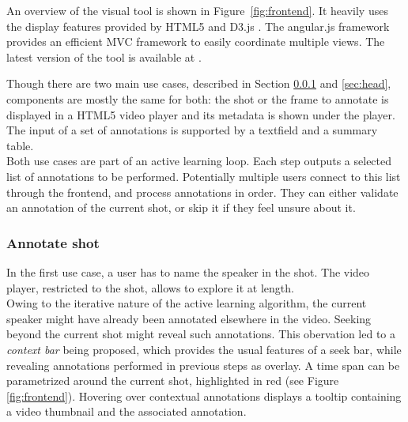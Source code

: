 \documentclass[a4paper]{article}
\begin{document}

An overview of the visual tool is shown in Figure~\ref{fig:frontend}. It heavily uses the display features provided by HTML5 and D3.js \cite{d3js}. The angular.js framework \cite{angularjs} provides an efficient MVC framework to easily coordinate multiple views. The latest version of the tool is available at \cite{urlfrontend}.



Though there are two main use cases, described in Section \ref{sec:shot} and \ref{sec:head}, components are mostly the same for both: the shot or the frame to annotate is displayed in a HTML5 video player and its metadata is shown under the player. The input of a set of annotations is supported by a textfield and a summary table.\\

Both use cases are part of an active learning loop. Each step outputs a selected list of annotations to be performed. Potentially multiple users connect to this list through the frontend, and process annotations in order. They can either validate an annotation of the current shot, or skip it if they feel unsure about it.



\subsubsection{Annotate shot} \label{sec:shot}
In the first use case, a user has to name the speaker in the shot. The video player, restricted to the shot, allows to explore it at length.\\
Owing to the iterative nature of the active learning algorithm, the current speaker might have already been annotated elsewhere in the video. Seeking beyond the current shot might reveal such annotations. This obervation led to a \emph{context bar} being proposed, which provides the usual features of a seek bar, while revealing annotations performed in previous steps as overlay. A time span can be parametrized around the current shot, highlighted in red (see Figure \ref{fig:frontend}). Hovering over contextual annotations displays a tooltip containing a video thumbnail and the associated annotation.\\
\end{document}

